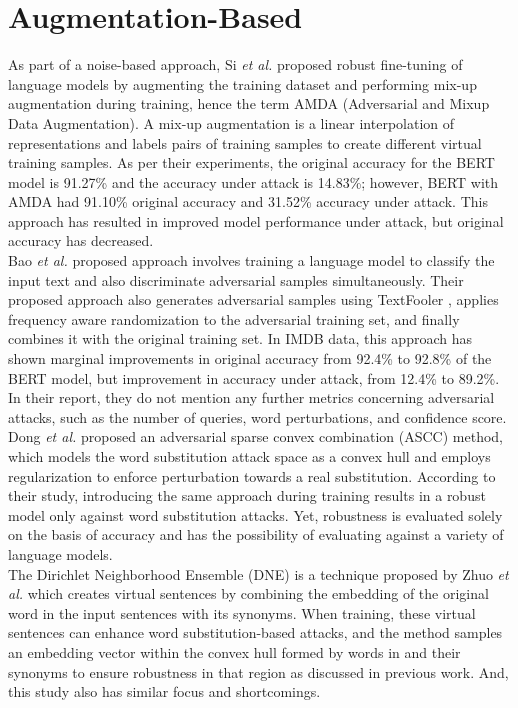 \documentclass[%
	BCOR=8mm, %
	DIV=12,
	toc=bibliography, %
	toc=listof, %
	oneside, %
	egregdoesnotlikesansseriftitles, %
	]{scrbook}
\begin{document}
\section{Augmentation-Based}
As part of a noise-based approach, Si \textit{et al.} \cite{si_better_2021}  proposed robust fine-tuning of language models by augmenting the training dataset and performing mix-up augmentation during training, hence the term AMDA (Adversarial and Mixup Data Augmentation). A mix-up augmentation is a linear interpolation of representations and labels pairs of training samples to create different virtual training samples. As per their experiments, the original accuracy for the BERT model is 91.27\% and the accuracy under attack is 14.83\%; however, BERT with AMDA had 91.10\% original accuracy and 31.52\% accuracy under attack. This approach has resulted in improved model performance under attack, but original accuracy has decreased.\\
Bao \textit{et al.} \cite{bao_defending_2021} proposed approach involves training a language model to classify the input text and also discriminate adversarial samples simultaneously. Their proposed approach also generates adversarial samples using TextFooler \cite{jin_is_2020}, applies frequency aware randomization to the adversarial training set, and finally combines it with the original training set. In IMDB data, this approach has shown marginal improvements in original accuracy from 92.4\% to 92.8\% of the BERT model, but improvement in accuracy under attack, from 12.4\% to 89.2\%. In their report, they do not mention any further metrics concerning adversarial attacks, such as the number of queries, word perturbations, and confidence score.\\
Dong \textit{et al. }\cite{dong_towards_2021-2} proposed an adversarial sparse convex combination (ASCC) method, which models the word substitution attack space as a convex hull and employs regularization to enforce perturbation towards a real substitution. According to their study, introducing the same approach during training results in a robust model only against word substitution attacks. Yet, robustness is evaluated solely on the basis of accuracy and has the possibility of evaluating against a variety of language models. \\
The Dirichlet Neighborhood Ensemble (DNE) is a technique proposed by Zhuo \textit{et al.} \cite{zhou_defense_2020} which creates virtual sentences by combining the embedding of the original word in the input sentences with its synonyms. When training, these virtual sentences can enhance word substitution-based attacks, and the method samples an embedding vector within the convex hull formed by words in and their synonyms to ensure robustness in that region as discussed in previous work. And, this study also has similar focus and shortcomings.\\
\end{document}
